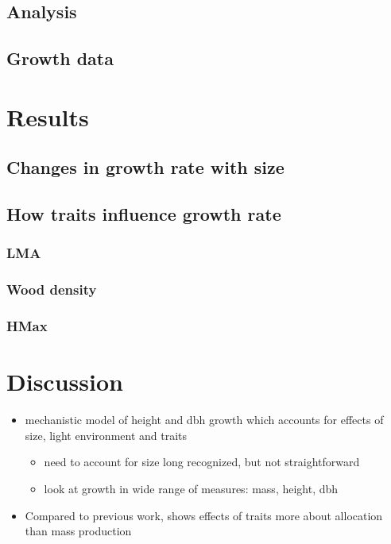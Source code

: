 \documentclass[12pt, a4paper]{article}
\begin{document}
\subsection*{Analysis}\label{analysis}

\subsection*{Growth data}\label{growth-data}

\section*{Results}\label{results}

\subsection*{Changes in growth rate with
size}\label{changes-in-growth-rate-with-size}

\subsection*{How traits influence growth
rate}\label{how-traits-influence-growth-rate}

\subsubsection*{LMA}\label{lma}

\subsubsection*{Wood density}\label{wood-density}

\subsubsection*{HMax}\label{hmax}

\section*{Discussion}\label{discussion}

\begin{itemize}
\itemsep1pt\parskip0pt
\item
  mechanistic model of height and dbh growth which accounts for effects
  of size, light environment and traits

  \begin{itemize}
  \itemsep1pt\parskip0pt
  \item
    need to account for size long recognized, but not straightforward
  \item
    look at growth in wide range of measures: mass, height, dbh
  \end{itemize}
\item
  Compared to previous work, shows effects of traits more about
  allocation than mass production
\end{itemize}
\end{document}
